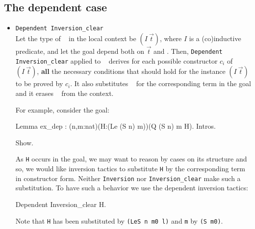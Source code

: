 \subsection{The dependent case}
\begin{itemize}
\item \texttt{Dependent Inversion\_clear} \ident~\\
  Let the type of \ident~ in the local context be $(I~\vec{t})$,
  where $I$ is a (co)inductive predicate, and let the goal  depend both on
  $\vec{t}$ and \ident. Then, 
  \texttt{Dependent Inversion\_clear} applied to \ident~ derives 
   for each possible constructor $c_i$ of $(I~\vec{t})$, {\bf all} the
  necessary conditions that should hold for the instance $(I~\vec{t})$ to be
  proved by $c_i$. It also substitutes  \ident~ for the corresponding
  term  in the goal and  it erases \ident~ from the context.


For example, consider the  goal:
\begin{coq_eval}
Lemma ex_dep : (n,m:nat)(H:(Le (S n) m))(Q (S n) m H).
Intros.
\end{coq_eval}

\begin{coq_example}
Show.
\end{coq_example}

As \texttt{H} occurs in the goal, we may want to reason by cases on its
structure and so, we would like  inversion tactics to
substitute \texttt{H} by the corresponding term in constructor form. 
Neither \texttt{Inversion} nor  {\tt Inversion\_clear} make such a
substitution. To have such a behavior we use the dependent inversion tactics:

\begin{coq_example}
Dependent Inversion_clear H.
\end{coq_example}

Note that \texttt{H} has been substituted by \texttt{(LeS n m0 l)} and
\texttt{m} by \texttt{(S m0)}.


\end{itemize}

